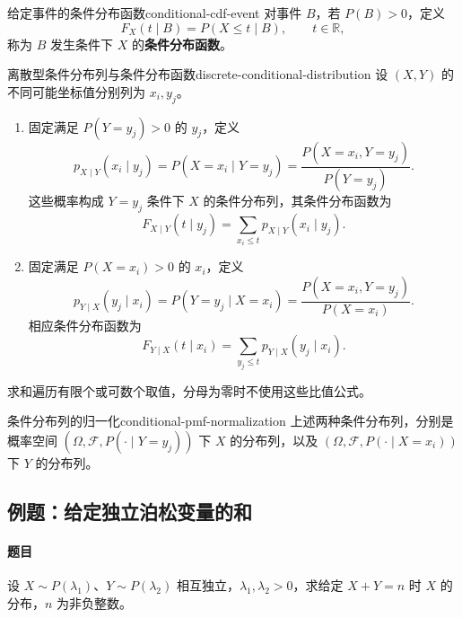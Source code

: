 \begin{mydefinition}{给定事件的条件分布函数}{conditional-cdf-event}
对事件 $B$，若 $P(B)>0$，定义
\[
F_X(t\mid B)=P(X\leq t\mid B),\qquad t\in\mathbb R,
\]
称为 $B$ 发生条件下 $X$ 的\textbf{条件分布函数}。
\end{mydefinition}

\begin{mydefinition}{离散型条件分布列与条件分布函数}{discrete-conditional-distribution}
设 $(X,Y)$ 的不同可能坐标值分别列为 $x_i,y_j$。
\begin{enumerate}
\item 固定满足 $P(Y=y_j)>0$ 的 $y_j$，定义
\[
p_{X\mid Y}(x_i\mid y_j)=P(X=x_i\mid Y=y_j)
=\frac{P(X=x_i,Y=y_j)}{P(Y=y_j)}.
\]
这些概率构成 $Y=y_j$ 条件下 $X$ 的条件分布列，其条件分布函数为
\[
F_{X\mid Y}(t\mid y_j)=\sum_{x_i\leq t}p_{X\mid Y}(x_i\mid y_j).
\]
\item 固定满足 $P(X=x_i)>0$ 的 $x_i$，定义
\[
p_{Y\mid X}(y_j\mid x_i)=P(Y=y_j\mid X=x_i)
=\frac{P(X=x_i,Y=y_j)}{P(X=x_i)}.
\]
相应条件分布函数为
\[
F_{Y\mid X}(t\mid x_i)=\sum_{y_j\leq t}p_{Y\mid X}(y_j\mid x_i).
\]
\end{enumerate}
求和遍历有限个或可数个取值，分母为零时不使用这些比值公式。
\end{mydefinition}

\begin{proposition}{条件分布列的归一化}{conditional-pmf-normalization}
上述两种条件分布列，分别是概率空间 $(\Omega,\mathcal F,P(\cdot\mid Y=y_j))$ 下 $X$ 的分布列，以及 $(\Omega,\mathcal F,P(\cdot\mid X=x_i))$ 下 $Y$ 的分布列。
\end{proposition}

\subsection{例题：给定独立泊松变量的和}\label{note:c3:e11}
\paragraph{题目}
设 $X\sim P(\lambda_1)$、$Y\sim P(\lambda_2)$ 相互独立，$\lambda_1,\lambda_2>0$，求给定 $X+Y=n$ 时 $X$ 的分布，$n$ 为非负整数。

